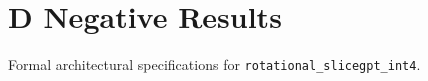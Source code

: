 \section{D Negative Results}

Formal architectural specifications for \texttt{rotational_slicegpt_int4}.
